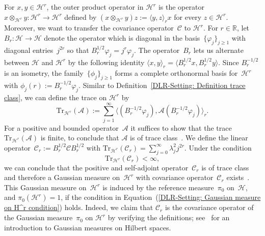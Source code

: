 For $x,y \in \mathcal{H}^r$, the outer product operator in $\mathcal{H}^r$ is the operator~$ x \otimes_{\mathcal{H}^r} y : \mathcal{H}^r \to \mathcal{H}^r $ defined by $ (x \otimes_{\mathcal{H}^r} y) z := \langle y, z \rangle_r x $ for every $ z \in \mathcal{H}^r$. Moreover, we want to transfer the covariance operator~$\mathcal{C}$ to $\mathcal{H}^r$. For $r \in \mathbb{R}$, let $B_r: \mathcal{H} \to \mathcal{H}$ denote the operator which is diagonal in the basis~$\{ \varphi_j \}_{j \geq 1}$ with diagonal entries~$j^{2r}$ so that $B_r^{1/2} \varphi_j = j^{r} \varphi_j$. The operator~$B_r$ lets us alternate between $\mathcal{H}$ and $\mathcal{H}^r$ by the following identity $ \langle x, y \rangle_r = \langle B_r^{1/2} x, B_r^{1/2} y \rangle$. Since $B_r^{-1/2} $ is an isometry, the family~$\{ \phi_j \}_{j \geq 1}$ forms a complete orthonormal basis for~$\mathcal{H}^r$ with $ \phi_j(r) := B_r^{-1/2} \varphi_j$. Similar to Definition~\ref{DLR-Setting: Definition trace class}, we can define the trace on $\mathcal{H}^r$ by
\begin{equation}
 \label{DLR-Setting: Trace on H^s}
 \text{Tr}_{\mathcal{H}^r}(\mathcal{A}) := \sum_{j=1}^{\infty} \langle (B_r^{-1/2}\varphi_j ), \mathcal{A}( B_r^{-1/2}\varphi_j) \rangle_r.
\end{equation}
For a positive and bounded operator~$\mathcal{A}$ it suffices to show that the trace~$\text{Tr}_{\mathcal{H}^r}(\mathcal{A})$ is finite, to conclude that $\mathcal{A}$ is of trace class~\autocite[Proposition C.3]{DaPrato1992}. We define the linear operator~$\mathcal{C}_r := B_r^{1/2} \mathcal{C} B_r^{1/2} $ with $ \text{Tr}_{\mathcal{H}^r}(\mathcal{C}_r) = \sum_{j=0}^{\infty} \lambda_j^2 j^{2r}$. Under the condition
\begin{equation}
\label{DLR-Setting: Gaussian measure on H^r condition}
 \text{Tr}_{\mathcal{H}^r}(\mathcal{C}_r) < \infty,
\end{equation}
we can conclude that the positive and self-adjoint operator~$\mathcal{C}_r$ is of trace class and therefore a Gaussian measure on~$\mathcal{H}^r$ with covariance operator~$\mathcal{C}_r$ exists~\autocite[Proposition 2.18]{DaPrato1992}. This Gaussian measure on~$\mathcal{H}^r$ is induced by the reference measure~$\pi_0$ on~$\mathcal{H}$, and $ \pi_0(\mathcal{H}^r ) =1$, if the condition in Equation~(\ref{DLR-Setting: Gaussian measure on H^r condition}) holds. Indeed, we claim that $\mathcal{C}_r$ is the covariance operator of the Gaussian measure~$\pi_0$ on $\mathcal{H}^r$ by verifying the definitions; see~\autocite[Chapter 2.3]{DaPrato1992} for an introduction to Gaussian measures on Hilbert spaces.

